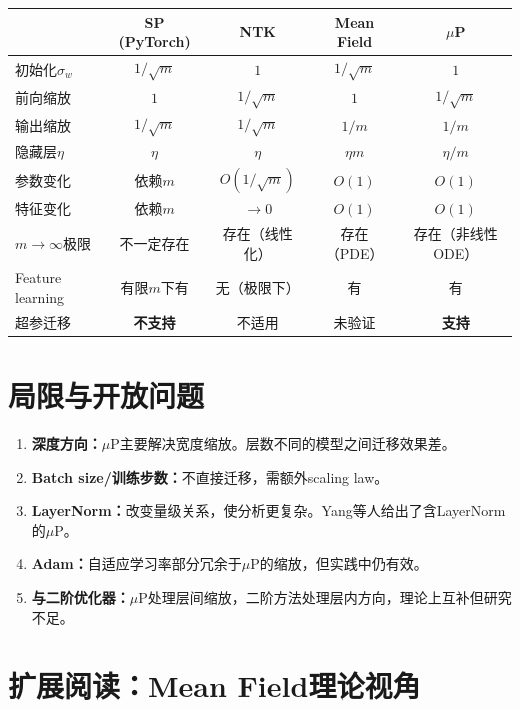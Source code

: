 \documentclass[11pt,a4paper]{article}
\begin{document}
\begin{center}
\small
\renewcommand{\arraystretch}{1.2}
\begin{tabular}{l|cccc}
\toprule
& SP (PyTorch) & NTK & Mean Field & $\mu$P \\
\midrule
初始化$\sigma_w$ & $1/\sqrt{m}$ & $1$ & $1/\sqrt{m}$ & $1$ \\
前向缩放 & $1$ & $1/\sqrt{m}$ & $1$ & $1/\sqrt{m}$ \\
输出缩放 & $1/\sqrt{m}$ & $1/\sqrt{m}$ & $1/m$ & $1/m$ \\
隐藏层$\eta$ & $\eta$ & $\eta$ & $\eta m$ & $\eta/m$ \\
参数变化 & 依赖$m$ & $O(1/\sqrt{m})$ & $O(1)$ & $O(1)$ \\
特征变化 & 依赖$m$ & $\to 0$ & $O(1)$ & $O(1)$ \\
$m\to\infty$极限 & 不一定存在 & 存在（线性化） & 存在（PDE） & 存在（非线性ODE） \\
Feature learning & 有限$m$下有 & 无（极限下） & 有 & 有 \\
超参迁移 & \textbf{不支持} & 不适用 & 未验证 & \textbf{支持} \\
\bottomrule
\end{tabular}
\end{center}

\section{局限与开放问题}

\begin{enumerate}[leftmargin=*]
\item \textbf{深度方向：}$\mu$P主要解决宽度缩放。层数不同的模型之间迁移效果差。
\item \textbf{Batch size/训练步数：}不直接迁移，需额外scaling law。
\item \textbf{LayerNorm：}改变量级关系，使分析更复杂。Yang等人给出了含LayerNorm的$\mu$P。
\item \textbf{Adam：}自适应学习率部分冗余于$\mu$P的缩放，但实践中仍有效。
\item \textbf{与二阶优化器：}$\mu$P处理层间缩放，二阶方法处理层内方向，理论上互补但研究不足。
\end{enumerate}

\section{扩展阅读：Mean Field理论视角}
\end{document}
